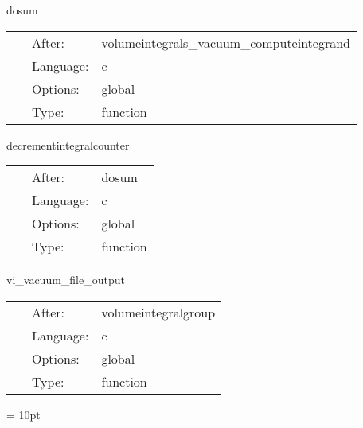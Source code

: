 \vspace{5mm}


\hspace{5mm} dosum 

\hspace{5mm}{\it do sum } 


\hspace{5mm}

 \begin{tabular*}{160mm}{cll} 
~ & After:  & volumeintegrals\_vacuum\_computeintegrand \\ 
~ & Language:  & c \\ 
~ & Options:  & global \\ 
~ & Type:  & function \\ 
\end{tabular*} 


\vspace{5mm}


\hspace{5mm} decrementintegralcounter 

\hspace{5mm}{\it decrement integralcounter variable } 


\hspace{5mm}

 \begin{tabular*}{160mm}{cll} 
~ & After:  & dosum \\ 
~ & Language:  & c \\ 
~ & Options:  & global \\ 
~ & Type:  & function \\ 
\end{tabular*} 


\vspace{5mm}


\hspace{5mm} vi\_vacuum\_file\_output 

\hspace{5mm}{\it output volumeintegral results to disk } 


\hspace{5mm}

 \begin{tabular*}{160mm}{cll} 
~ & After:  & volumeintegralgroup \\ 
~ & Language:  & c \\ 
~ & Options:  & global \\ 
~ & Type:  & function \\ 
\end{tabular*} 



\vspace{5mm}\parskip = 10pt 
